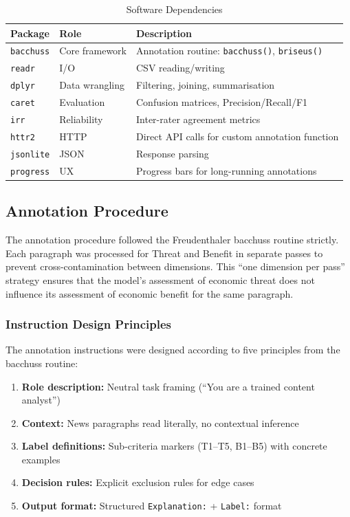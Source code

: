 \begin{table}[H]
\centering
\caption{Software Dependencies}
\label{tab:software}
\begin{tabular}{@{}llp{7cm}@{}}
\toprule
\textbf{Package} & \textbf{Role} & \textbf{Description} \\
\midrule
\texttt{bacchuss} & Core framework & Annotation routine: \texttt{bacchuss()}, \texttt{briseus()} \\
\texttt{readr} & I/O & CSV reading/writing \\
\texttt{dplyr} & Data wrangling & Filtering, joining, summarisation \\
\texttt{caret} & Evaluation & Confusion matrices, Precision/Recall/F1 \\
\texttt{irr} & Reliability & Inter-rater agreement metrics \\
\texttt{httr2} & HTTP & Direct API calls for custom annotation function \\
\texttt{jsonlite} & JSON & Response parsing \\
\texttt{progress} & UX & Progress bars for long-running annotations \\
\bottomrule
\end{tabular}
\end{table}

\subsection{Annotation Procedure}

The annotation procedure followed the Freudenthaler bacchuss routine strictly. Each paragraph was processed for Threat and Benefit in separate passes to prevent cross-contamination between dimensions. This ``one dimension per pass'' strategy ensures that the model's assessment of economic threat does not influence its assessment of economic benefit for the same paragraph.

\subsubsection{Instruction Design Principles}

The annotation instructions were designed according to five principles from the bacchuss routine:

\begin{enumerate}
    \item \textbf{Role description:} Neutral task framing (``You are a trained content analyst'')
    \item \textbf{Context:} News paragraphs read literally, no contextual inference
    \item \textbf{Label definitions:} Sub-criteria markers (T1--T5, B1--B5) with concrete examples
    \item \textbf{Decision rules:} Explicit exclusion rules for edge cases
    \item \textbf{Output format:} Structured \texttt{Explanation:} + \texttt{Label:} format
\end{enumerate}

